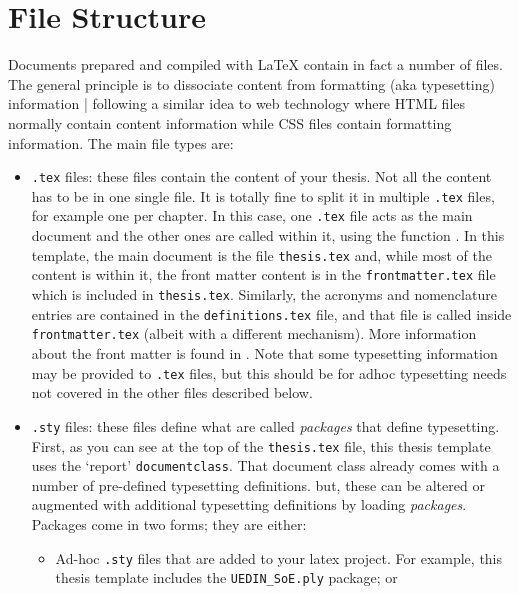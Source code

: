 \documentclass[11pt,twoside,openright]{report}
\begin{document}
\section{File Structure}

Documents prepared and compiled with \LaTeX{} contain in fact a number of files.
The general principle is to dissociate content from formatting (aka typesetting) information | following a similar idea to web technology where HTML files normally contain  content information while CSS files contain formatting information. The main file types are:

\begin{itemize}[noitemsep]
  \item \verb|.tex| files: these files contain the content of your thesis. Not all the content has to be in one single file. It is totally fine to split it in multiple \verb|.tex| files, for example one per chapter. In this case, one \verb|.tex| file acts as the main document and the other ones are called within it, using the function \verb||. In this template, the main document is the file \verb|thesis.tex| and, while most of the content is within it, the front matter content is in the \verb|frontmatter.tex| file which is included in \verb|thesis.tex|. Similarly, the acronyms and nomenclature entries are contained in the \verb|definitions.tex| file, and that file is called inside \verb|frontmatter.tex| (albeit with a different mechanism). More information about the front matter is found in .
  Note that some typesetting information may be provided to \verb|.tex| files, but this should be for adhoc typesetting needs not covered in the other files described below.
  
  \item \verb|.sty| files: these files define what are called \emph{packages} that define typesetting. First, as you can see at the top of the \verb|thesis.tex| file, this thesis template uses the `report' \verb|documentclass|. That document class already comes with a number of pre-defined typesetting definitions. but, these can be altered or augmented with additional typesetting definitions by loading \emph{packages}. Packages come in two forms; they are either:           
    \begin{itemize}[noitemsep]
        \item Ad-hoc \verb|.sty| files that are added to your latex project. For example, this thesis template includes the \verb|UEDIN_SoE.ply| package; or
        

\end{itemize}
\end{itemize}
\end{document}
